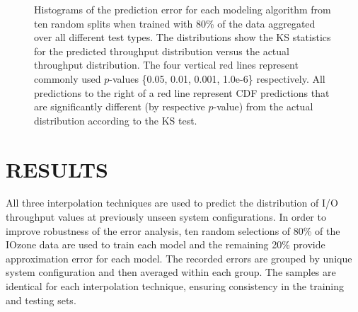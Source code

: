 \documentclass[smallextended]{svjour3}       %
\begin{document}
\begin{figure}
  \caption{Histograms of the prediction error for each modeling algorithm from ten random splits when trained with 80\% of the data aggregated over all different test types. The distributions show the KS statistics for the predicted throughput distribution versus the actual throughput distribution. The four vertical red lines represent commonly used $p$-values \{0.05, 0.01, 0.001, 1.0e-6\} respectively. All predictions to the right of a red line represent CDF predictions that are significantly different (by respective $p$-value) from the actual distribution according to the KS test.
  \vspace{-.1cm}}
  \label{fig:ks_histogram_80_20}
\end{figure}

\section{RESULTS}
\label{sec:results}

All three interpolation techniques are used to predict the distribution of I/O throughput values at previously unseen system configurations. In order to improve robustness of the error analysis, ten random selections of 80\% of the IOzone data are used to train each model and the remaining 20\% provide approximation error for each model. The recorded errors are grouped by unique system configuration and then averaged within each group. The samples are identical for each interpolation technique, ensuring consistency in the training and testing sets.
\end{document}
